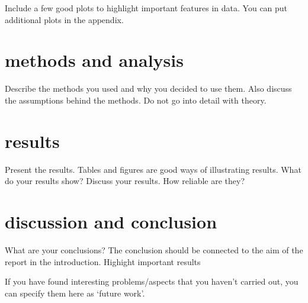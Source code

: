 \documentclass{article}
\begin{document}
Include a few good plots to highlight important features in data. You can put additional plots in the appendix.

\section{methods and analysis}

Describe the methods you used and why you decided to use them. 
Also discuss the assumptions behind the methods. Do not go into detail with theory.

\section{results}

Present the results.
Tables and figures are good ways of illustrating results.
What do your results show?
Discuss your results. How reliable are they?

\section{discussion and conclusion}

What are your conclusions? The conclusion should be connected to the aim of the report in the introduction.
	Highight important results
	
If you have found interesting problems/aspects that you haven’t carried out, you can specify them here as ‘future work’.
\end{document}
